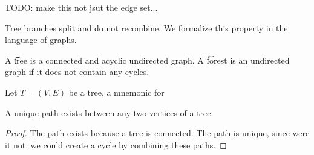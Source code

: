 
TODO: make this not jsut the edge set...

Tree branches split and do not recombine.
We formalize this property in the language of graphs.


A \t{tree} is a connected and acyclic undirected graph.
A \t{forest} is an undirected graph if it does not contain any cycles.




Let $T = (V, E)$ be a tree, a mnemonic for 
%

%
%

\begin{proposition}

A unique path exists between any two vertices of a tree.

\begin{proof}
The path exists because a tree is connected.
The path is unique, since were it not, we could create a cycle by combining these paths.
\end{proof}

\end{proposition}
